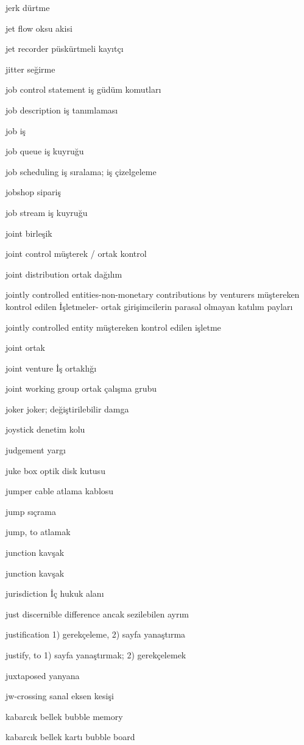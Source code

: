 \documentclass[12pt,fleqn]{article}\usepackage{../../common}
\begin{document}
jerk dürtme

jet flow oksu akisi

jet recorder püskürtmeli kayıtçı

jitter seğirme

job control statement iş güdüm komutları

job description iş tanımlaması

job iş

job queue iş kuyruğu

job scheduling iş sıralama; iş çizelgeleme

jobshop sipariş

job stream iş kuyruğu

joint birleşik

joint control müşterek / ortak kontrol

joint distribution ortak dağılım

jointly controlled entities-non-monetary contributions by venturers müştereken kontrol edilen İşletmeler- ortak girişimcilerin parasal olmayan katılım payları 

jointly controlled entity müştereken kontrol edilen işletme

joint ortak

joint venture İş ortaklığı

joint working group ortak çalışma grubu

joker joker; değiştirilebilir damga

joystick denetim kolu

judgement yargı

juke box optik disk kutusu

jumper cable atlama kablosu

jump sıçrama

jump, to atlamak

junction kavşak

junction kavşak

jurisdiction İç hukuk alanı

just discernible difference ancak sezilebilen ayrım

justification 1) gerekçeleme, 2) sayfa yanaştırma

justify, to 1) sayfa yanaştırmak; 2) gerekçelemek

juxtaposed yanyana

jw-crossing sanal eksen kesişi

kabarcık bellek bubble memory

kabarcık bellek kartı bubble board
\end{document}
